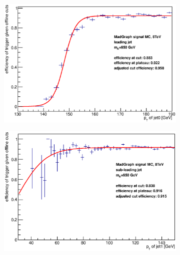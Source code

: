 \begin{figure}[phtb!]
\begin{center}
  \begin{subfigure}[leading jet, $m_{A}=650$ GeV]{0.4\textwidth}\includegraphics[width=\textwidth]{Systematics/images/jet0_trigger_turn_on_bAbb_650_j35.eps}\end{subfigure}
  \begin{subfigure}[sub-leading jet, $m_{A}=650$ GeV]{0.4\textwidth}\includegraphics[width=\textwidth]{Systematics/images/jet1_trigger_turn_on_bAbb_650_j35.eps}\end{subfigure}

\end{center}
\end{figure}
